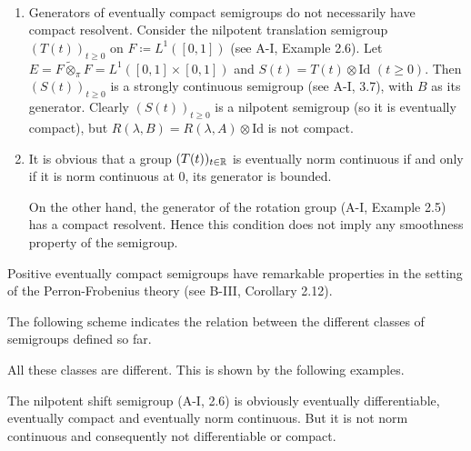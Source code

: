 \begin{remark}\label{rem:a2-1.26} ~
	\vspace{ -0.5\baselineskip}
\begin{enumerate}[\upshape (i), wide, labelsep=.5em]
\item \label{rem:a2-1.26.1}
Generators of eventually compact semigroups do not necessarily have compact resolvent.
Consider the nilpotent translation semigroup $(T(t))_{t\geq 0}$ on $F \coloneqq L^{1}([0,1])$ (see A-I, Example 2.6).
Let $E = F \widetilde{\otimes}_{\pi} F = L^{1}([0,1] \times [0,1])$ and $S(t) = T(t) \otimes \text{Id}$ $(t \geq 0)$.
Then $(S(t))_{t\geq 0}$ is a strongly continuous semigroup (see A-I, 3.7), 
with $B$ as its generator.
Clearly $(S(t))_{t\geq 0}$ is a nilpotent semigroup (so it is eventually compact), but $R(\lambda,B) = R(\lambda,A) \otimes \text{Id}$ is not compact.

\item \label{rem:a2-1.26.2}
It is obvious that a group $(T(t))_{t \in \mathbb{R}}$ is eventually norm continuous if and only if it is norm continuous at $0$, \ie its generator is bounded.

On the other hand, the generator of the rotation group (A-I, Example 2.5) 
has a compact resolvent.
Hence this condition does not imply any smoothness property of the semigroup.
\end{enumerate}
\end{remark}

Positive eventually compact semigroups have remarkable properties in the setting of the Perron-Frobenius theory (see \eg B-III, Corollary 2.12).

The following scheme indicates the relation between the different classes of semigroups defined so far.


All these classes are different.
This is shown by the following examples.
\begin{example}\label{ex:a2-1.27}
The nilpotent shift semigroup (A-I, 2.6) is obviously eventually differentiable, eventually compact and eventually norm continuous.
But it is not norm continuous and consequently not differentiable or compact.
\end{example}

